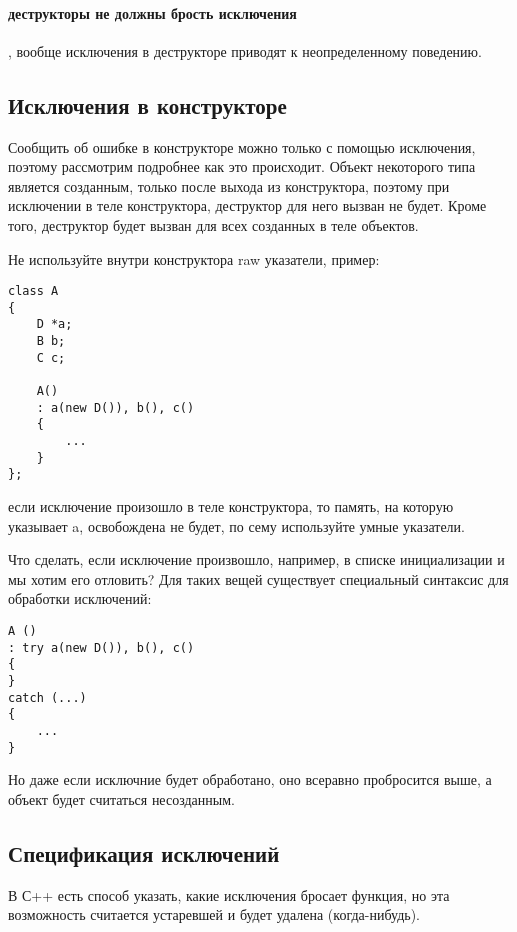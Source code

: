\paragraph{деструкторы не должны брость исключения}

, вообще исключения в деструкторе приводят к неопределенному поведению.

\subsection{Исключения в конструкторе}

Сообщить об ошибке в конструкторе можно только с помощью исключения, поэтому рассмотрим подробнее как это происходит. Объект некоторого типа
является созданным, только после выхода из конструктора, поэтому при исключении в теле конструктора, деструктор для него вызван не будет.
Кроме того, деструктор будет вызван для всех созданных в теле объектов.

Не используйте внутри конструктора raw указатели, пример:

\begin{lstlisting}
class A
{
	D *a;
	B b;
	C c;
	
	A()
	: a(new D()), b(), c()
	{
		...
	}
};
\end{lstlisting}
если исключение произошло в теле конструктора, то память, на которую указывает a, освобождена не будет, по сему используйте умные указатели.

Что сделать, если исключение произвошло, например, в списке инициализации и мы хотим его отловить? Для таких вещей существует специальный
синтаксис для обработки исключений:

\begin{lstlisting}
A ()
: try a(new D()), b(), c()
{
}
catch (...)
{
	...
}
\end{lstlisting}

Но даже если исключние будет обработано, оно всеравно пробросится выше, а объект будет считаться несозданным.

\subsection{Спецификация исключений}

В С++ есть способ указать, какие исключения бросает функция, но эта возможность считается устаревшей и будет удалена (когда-нибудь).